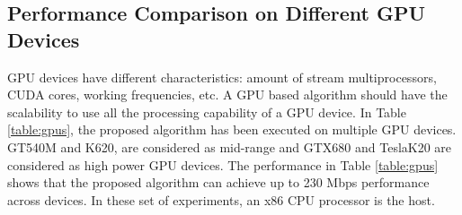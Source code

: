 \documentclass{article}
\begin{document}
\subsection{Performance Comparison on Different GPU Devices}

GPU devices have different characteristics: amount of stream multiprocessors, CUDA cores, working frequencies, etc. A GPU based algorithm should have the scalability to use all the processing capability of a GPU device. In Table \ref{table:gpus}, the proposed algorithm has been executed on multiple GPU devices. GT540M and K620, are considered as mid-range and GTX680 and TeslaK20 are considered as high power GPU devices. The performance in Table \ref{table:gpus} shows that the proposed algorithm can achieve up to 230 Mbps performance across devices. In these set of experiments, an x86 CPU processor is the host.
\end{document}
